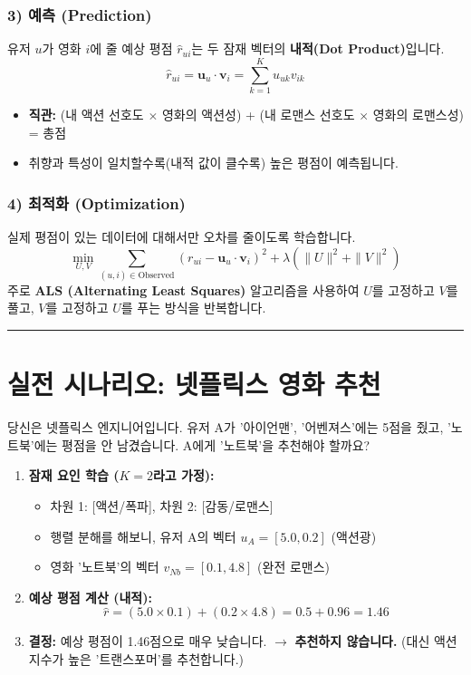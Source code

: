 \documentclass[11pt,a4paper]{book}
\theoremstyle{definition}
\begin{document}
\subsubsection*{3) 예측 (Prediction)}
유저 $u$가 영화 $i$에 줄 예상 평점 $\hat{r}_{ui}$는 두 잠재 벡터의 \textbf{내적(Dot Product)}입니다.
$$ \hat{r}_{ui} = \mathbf{u}_u \cdot \mathbf{v}_i = \sum_{k=1}^{K} u_{uk} v_{ik} $$
\begin{itemize}
    \item \textbf{직관:} (내 액션 선호도 $\times$ 영화의 액션성) + (내 로맨스 선호도 $\times$ 영화의 로맨스성) = 총점
    \item 취향과 특성이 일치할수록(내적 값이 클수록) 높은 평점이 예측됩니다.
\end{itemize}

\subsubsection*{4) 최적화 (Optimization)}
실제 평점이 있는 데이터에 대해서만 오차를 줄이도록 학습합니다.
$$ \min_{U, V} \sum_{(u,i) \in \text{Observed}} (r_{ui} - \mathbf{u}_u \cdot \mathbf{v}_i)^2 + \lambda(\|U\|^2 + \|V\|^2) $$
주로 \textbf{ALS (Alternating Least Squares)} 알고리즘을 사용하여 $U$를 고정하고 $V$를 풀고, $V$를 고정하고 $U$를 푸는 방식을 반복합니다.

\vspace{0.5cm}\hrule\vspace{0.5cm}

\section{실전 시나리오: 넷플릭스 영화 추천}

\begin{storybox}[title={Scenario: 당신이 아직 안 본 '명작' 찾기}]
당신은 넷플릭스 엔지니어입니다. 유저 A가 '아이언맨', '어벤져스'에는 5점을 줬고, '노트북'에는 평점을 안 남겼습니다. A에게 '노트북'을 추천해야 할까요?
\end{storybox}

\begin{enumerate}
    \item \textbf{잠재 요인 학습 ($K=2$라고 가정):}
    \begin{itemize}
        \item 차원 1: [액션/폭파], 차원 2: [감동/로맨스]
        \item 행렬 분해를 해보니, 유저 A의 벡터 $u_A = [5.0, 0.2]$ (액션광)
        \item 영화 '노트북'의 벡터 $v_{Nb} = [0.1, 4.8]$ (완전 로맨스)
    \end{itemize}
    
    \item \textbf{예상 평점 계산 (내적):}
    $$ \hat{r} = (5.0 \times 0.1) + (0.2 \times 4.8) = 0.5 + 0.96 = 1.46 $$
    
    \item \textbf{결정:} 예상 평점이 1.46점으로 매우 낮습니다.
    $\rightarrow$ \textbf{추천하지 않습니다.} (대신 액션 지수가 높은 '트랜스포머'를 추천합니다.)
\end{enumerate}
\end{document}
